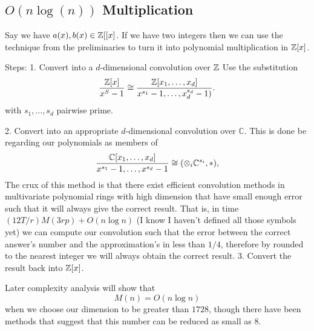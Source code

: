 \subsection{$O(n\log(n))$ Multiplication}
\label{subsec:nlogn}

Say we have $a(x) , b(x) \in {\mathbb Z}[[x]$. If we have two integers then we can use the technique from the preliminaries to turn it into polynomial multiplication in ${\mathbb Z}[x]$.

Steps:
1. Convert into a $d$-dimensional convolution over ${\mathbb Z}$
Use the substitution
\[
  \frac{{\mathbb Z}[x]}{x^S - 1} \cong \frac{{\mathbb Z}[x_1, \ldots, x_d]}{x^{s_1} - 1, \ldots, x_d^{s_d} - 1)}.
\]
with $s_1, \ldots, s_d$ pairwise prime.

2. Convert into an appropriate $d$-dimensional convolution over $\mathbb{C}$.
This is done be regarding our polynomials as members of
\[
  \frac{\mathbb{C}[x_1, \ldots, x_d]}{x^{s_1} - 1, \ldots, x^{s_d} - 1} \cong (\otimes_i \mathbb{C}^{s_i}, \ast),
\]
The crux of this method is that there exist efficient convolution methods in multivariate polynomial rings with high dimension that have small enough error such that it will always give the correct result. That is, in time $(12T/r)M(3rp) + O(n\log n)$ (I know I haven't defined all those symbols yet) we can compute our convolution such that the error between the correct answer's number and the approximation's in less than $1 / 4$, therefore by rounded to the nearest integer we will always obtain the correct result.
3. Convert the result back into ${\mathbb Z}[x]$.

Later complexity analysis will show that 
\[
  M(n) = O(n \log n)
\]
when we choose our dimension to be greater than $1728$, though there have been methods that suggest that this number can be reduced as small as $8$.

